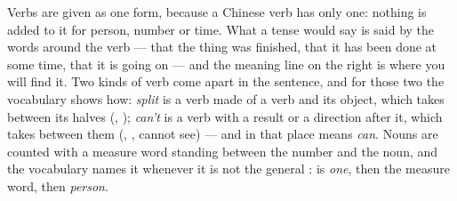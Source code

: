{\smallskip
Verbs are given as one form, because a Chinese verb has only one: nothing is
added to it for person, number or time. What a tense would say is said by the
words around the verb —  that the thing was finished,  that it
has been done at some time,  that it is going on — and the meaning line
on the right is where you will find it. Two kinds of verb come apart in the
sentence, and for those two the vocabulary shows how: \textit{split} is a verb
made of a verb and its object, which takes  between its halves
(, ); \textit{can't} is a verb with a result or a
direction after it, which takes  between them (, ,
cannot see) — and  in that place means \textit{can}. Nouns are
counted with a measure word standing between the number and the noun, and the
vocabulary names it whenever it is not the general :  is
\textit{one}, then the measure word, then \textit{person}.
}
